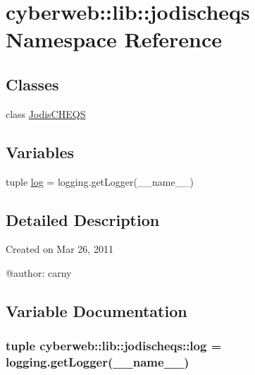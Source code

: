 \hypertarget{namespacecyberweb_1_1lib_1_1jodischeqs}{\section{cyberweb\-:\-:lib\-:\-:jodischeqs \-Namespace \-Reference}
\label{namespacecyberweb_1_1lib_1_1jodischeqs}
}
\subsection*{\-Classes}
\begin{DoxyCompactItemize}
\item 
class \hyperlink{classcyberweb_1_1lib_1_1jodischeqs_1_1_jodis_c_h_e_q_s}{\-Jodis\-C\-H\-E\-Q\-S}
\end{DoxyCompactItemize}
\subsection*{\-Variables}
\begin{DoxyCompactItemize}
\item 
tuple \hyperlink{namespacecyberweb_1_1lib_1_1jodischeqs_a263eda1c73e9e904b1dffdc4d0494431}{log} = logging.\-get\-Logger(\-\_\-\-\_\-name\-\_\-\-\_\-)
\end{DoxyCompactItemize}


\subsection{\-Detailed \-Description}
\begin{DoxyVerb}
Created on Mar 26, 2011

@author: carny
\end{DoxyVerb}
 

\subsection{\-Variable \-Documentation}
\hypertarget{namespacecyberweb_1_1lib_1_1jodischeqs_a263eda1c73e9e904b1dffdc4d0494431}{
\subsubsection[{log}]{\setlength{\rightskip}{0pt plus 5cm}tuple {\bf cyberweb\-::lib\-::jodischeqs\-::log} = logging.\-get\-Logger(\-\_\-\-\_\-name\-\_\-\-\_\-)}}\label{namespacecyberweb_1_1lib_1_1jodischeqs_a263eda1c73e9e904b1dffdc4d0494431}
